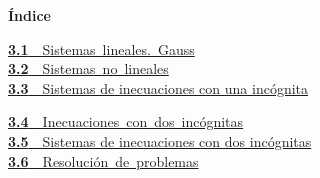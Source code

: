 \documentclass[11pt,a4paper]{article}
\begin{document}
\begin{tcolorbox}[colback=fmsurface,colframe=fmsurface,arc=3mm,left=4mm,right=4mm,top=2mm,bottom=2mm]
\small\textbf{Índice}\par\smallskip
\begin{minipage}[t]{0.49\linewidth}\small \mbox{\hyperlink{sec1}{\textbf{\color{fmgreen}3.1}\ \ Sistemas lineales. Gauss}}\\[3pt]
\mbox{\hyperlink{sec2}{\textbf{\color{fmgreen}3.2}\ \ Sistemas no lineales}}\\[3pt]
\hyperlink{sec3}{\textbf{\color{fmgreen}3.3}\ \ Sistemas de inecuaciones con una incógnita}\\[3pt]\end{minipage}\hfill\begin{minipage}[t]{0.49\linewidth}\small \mbox{\hyperlink{sec4}{\textbf{\color{fmgreen}3.4}\ \ Inecuaciones con dos incógnitas}}\\[3pt]
\hyperlink{sec5}{\textbf{\color{fmgreen}3.5}\ \ Sistemas de inecuaciones con dos incógnitas}\\[3pt]
\mbox{\hyperlink{sec6}{\textbf{\color{fmgreen}3.6}\ \ Resolución de problemas}}\\[3pt]\end{minipage}
\end{tcolorbox}

\end{document}
